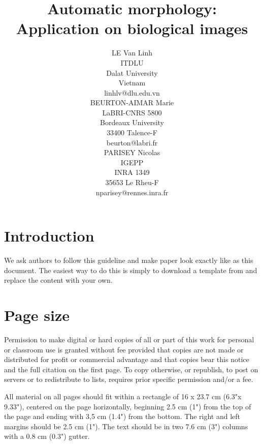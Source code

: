 \documentclass[twoside,twocolumn,10pt]{article}
\title{Automatic morphology: Application on biological images}
\author{
\parbox{0.25\textwidth}{\centering
LE Van Linh\\[1mm]
ITDLU\\
Dalat University\\
Vietnam\\
linhlv@dlu.edu.vn
}
\hspace{0.05\textwidth}
\parbox{0.25\textwidth}{\centering
BEURTON-AIMAR Marie\\[1mm]
LaBRI-CNRS 5800\\
Bordeaux University\\
33400 Talence-F\\
beurton@labri.fr
}
\hspace{0.05\textwidth}
\parbox{0.25\textwidth}{\centering
PARISEY Nicolas\\[1mm]
IGEPP\\
INRA 1349\\
35653 Le Rheu-F\\
nparisey@rennes.inra.fr
}
}
\begin{document}





\section{Introduction}

\copyrightspace

We ask authors to follow this guideline and make paper look exactly like as this document. The easiest way to do this is simply to download a template from \cite{jou01a} and replace the content with your own.

\section{Page size}
Permission to make digital or hard copies of all or part of this work for personal or classroom use is granted without fee provided that copies are not made or distributed for profit or commercial advantage and that copies bear this notice and the full citation on the first page. To copy otherwise, or republish, to post on servers or to redistribute to lists, requires prior specific permission and/or a fee. 

All material on all pages should fit within a rectangle of 16 x 23.7 cm (6.3"x 9.33"), centered on the page horizontally, beginning 2.5 cm (1") from the top of the page and ending with 3,5 cm (1.4") from the bottom.  The right and left margins should be 2.5 cm (1"). The text should be in two 7.6 cm (3") columns with a 0.8 cm (0.3") gutter. 
\end{document}
